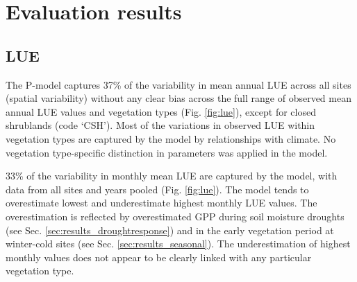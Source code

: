 \documentclass{myreport}
\begin{document}
\section{Evaluation results}
\label{sec:results}

\subsection{LUE}

The P-model captures 37\% of the variability in mean annual LUE across all sites (spatial variability) without any clear bias across the full range of observed mean annual LUE values and vegetation types (Fig. \ref{fig:lue}), except for closed shrublands (code `CSH'). Most of the variations in observed LUE within vegetation types are captured by the model by relationships with climate. No vegetation type-specific distinction in parameters was applied in the model. 

33\% of the variability in monthly mean LUE are captured by the model, with data from all sites and years pooled (Fig. \ref{fig:lue}). The model tends to overestimate lowest and underestimate highest monthly LUE values. The overestimation is reflected by overestimated GPP during soil moisture droughts (see Sec. \ref{sec:results_droughtresponse}) and in the early vegetation period at winter-cold sites (see Sec. \ref{sec:results_seasonal}). The underestimation of highest monthly values does not appear to be clearly linked with any particular vegetation type.
\end{document}
